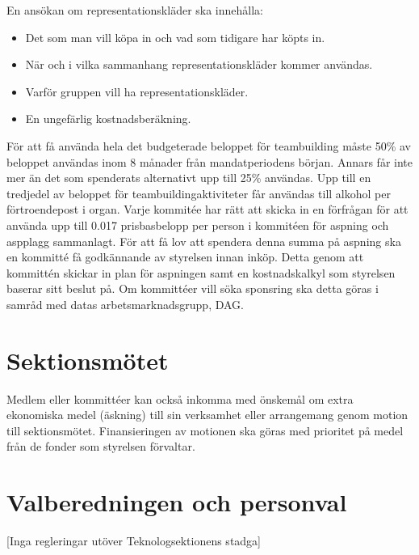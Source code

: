 \documentclass[a4paper]{dteklag}
\begin{document}
\para
En ansökan om representationskläder ska innehålla:
\begin{itemize}
  \item Det som man vill köpa in och vad som tidigare har köpts in.
  \item När och i vilka sammanhang representationskläder kommer användas.
  \item Varför gruppen vill ha representationskläder.
  \item En ungefärlig kostnadsberäkning.
\end{itemize}
\para[Teambuilding] För att få använda hela det budgeterade beloppet för teambuilding måste 50\% av beloppet användas inom 8 månader från mandatperiodens början. Annars får inte mer än det som spenderats alternativt upp till 25\% användas.
\para Upp till en tredjedel av beloppet för teambuildingaktiviteter får användas till alkohol per förtroendepost i organ.
\para [Aspning] Varje kommitée har rätt att skicka in en förfrågan för att använda upp till
0.017 prisbasbelopp per person i kommitéen för aspning och aspplagg sammanlagt. För att
få lov att spendera denna summa på aspning ska en kommitté få godkännande av
styrelsen innan inköp. Detta genom att kommittén skickar in plan för aspningen samt
en kostnadskalkyl som styrelsen baserar sitt beslut på.
\para[Sponsring] Om kommittéer vill söka sponsring ska detta göras i samråd med datas arbetsmarknadsgrupp, DAG.
\section{Sektionsmötet}
\para Medlem eller kommittéer kan också inkomma med önskemål om extra ekonomiska medel (äskning) till sin verksamhet eller arrangemang genom motion till sektionsmötet. Finansieringen av motionen ska göras med prioritet på medel från de fonder som styrelsen förvaltar.
\section{Valberedningen och personval}
\begin{center}
  [Inga regleringar utöver Teknologsektionens stadga]
\end{center}
\end{document}
